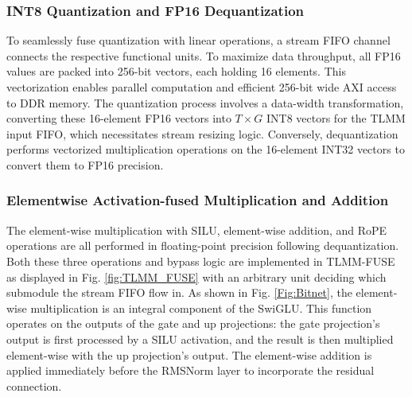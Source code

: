 \documentclass[sigconf]{acmart}
\begin{document}
\subsubsection{INT8 Quantization and FP16 Dequantization}
To seamlessly fuse quantization with linear operations, a stream FIFO channel connects the respective functional units. To maximize data throughput, all FP16 values are packed into 256-bit vectors, each holding 16 elements. This vectorization enables parallel computation and efficient 256-bit wide AXI access to DDR memory. The quantization process involves a data-width transformation, converting these 16-element FP16 vectors into $T \times G$ INT8 vectors for the TLMM input FIFO, which necessitates stream resizing logic. Conversely, dequantization performs vectorized multiplication operations on the 16-element INT32 vectors to convert them to FP16 precision.


\subsubsection{Elementwise Activation-fused Multiplication and Addition}
The element-wise multiplication with SILU, element-wise addition, and RoPE operations are all performed in floating-point precision following dequantization. Both these three operations and bypass logic are implemented in TLMM-FUSE as displayed in Fig. \ref{fig:TLMM_FUSE} with an arbitrary unit deciding which submodule the stream FIFO flow in. As shown in Fig. \ref{Fig:Bitnet}, the element-wise multiplication is an integral component of the SwiGLU. This function operates on the outputs of the gate and up projections: the gate projection's output is first processed by a SILU activation, and the result is then multiplied element-wise with the up projection's output. The element-wise addition is applied immediately before the RMSNorm layer to incorporate the residual connection.
\end{document}
